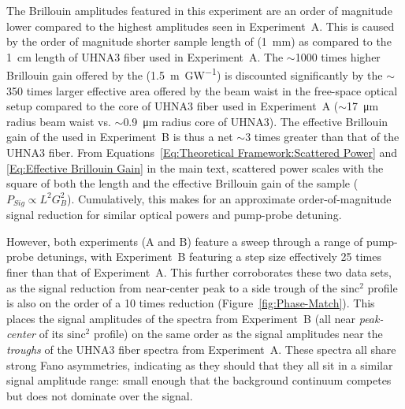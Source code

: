 The Brillouin amplitudes featured in this experiment are an order of magnitude lower compared to the highest amplitudes seen in Experiment~A. This is caused by the order of magnitude shorter sample length of  (\SI{1}{\milli\meter}) as compared to the \SI{1}{\centi\meter} length of \ac{UHNA3} fiber used in Experiment~A. The \(\sim\)1000 times higher Brillouin gain offered by the  (\SI{1.5}{\meter\per\giga\watt}) is discounted significantly by the \(\sim\)350 times larger effective area offered by the beam waist in the free-space optical setup compared to the core of \ac{UHNA3} fiber used in Experiment~A (\(\sim\)\SI{17}{\micro\meter} radius beam waist vs. \(\sim\)\SI{0.9}{\micro\meter} radius core of UHNA3). The effective Brillouin gain of the  used in Experiment~B is thus a net \(\sim\)3 times greater than that of the \ac{UHNA3} fiber. From Equations~\ref{Eq:Theoretical Framework:Scattered Power} and \ref{Eq:Effective Brillouin Gain} in the main text, scattered power scales with the square of both the length and the effective Brillouin gain of the sample (\(P_{Sig} \propto L^{2}G_{B}^{2}\)). Cumulatively, this makes for an approximate order-of-magnitude signal reduction for similar optical powers and pump-probe detuning.

However, both experiments (A and B) feature a sweep through a range of pump-probe detunings, with Experiment~B featuring a step size effectively 25 times finer than that of Experiment~A. This further corroborates these two data sets, as the signal reduction from near-center peak to a side trough of the \(\mathrm{sinc^{2}}\) profile is also on the order of a 10 times reduction (Figure~\ref{fig:Phase-Match}). This places the signal amplitudes of the  spectra from Experiment~B (all near \textit{peak-center} of its \(\mathrm{sinc^{2}}\) profile) on the same order as the signal amplitudes near the \textit{troughs} of the UHNA3 fiber spectra from Experiment~A. These spectra all share strong Fano asymmetries, indicating as they should that they all sit in a similar signal amplitude range: small enough that the background continuum competes but does not dominate over the signal.

